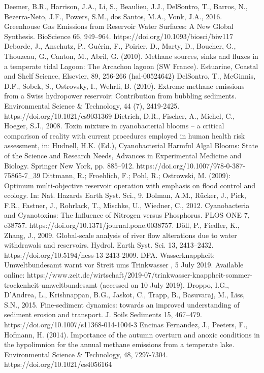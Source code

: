\begin{thebibliography}{}
Deemer, B.R., Harrison, J.A., Li, S., Beaulieu, J.J., DelSontro, T., Barros, N., Bezerra-Neto, J.F., Powers, S.M., dos Santos, M.A., Vonk, J.A., 2016. Greenhouse Gas Emissions from Reservoir Water Surfaces: A New Global Synthesis. BioScience 66, 949–964. https://doi.org/10.1093/biosci/biw117
Deborde, J., Anschutz, P., Guérin, F., Poirier, D., Marty, D., Boucher, G., Thouzeau, G., Canton, M., Abril, G. (2010). Methane sources, sinks and fluxes in a temperate tidal Lagoon: The Arcachon lagoon (SW France). Estuarine, Coastal and Shelf Science, Elsevier, 89, 256-266 (hal-00524642)
DelSontro, T., McGinnis, D.F., Sobek, S., Ostrovsky, I., Wehrli, B. (2010). Extreme methane emissions from a Swiss hydropower reservoir: Contribution from bubbling sediments. Environmental Science & Technology, 44 (7), 2419-2425. https://doi.org/10.1021/es9031369
Dietrich, D.R., Fischer, A., Michel, C., Hoeger, S.J., 2008. Toxin mixture in cyanobacterial blooms – a critical comparison of reality with current procedures employed in human health risk assessment, in: Hudnell, H.K. (Ed.), Cyanobacterial Harmful Algal Blooms: State of the Science and Research Needs, Advances in Experimental Medicine and Biology. Springer New York, pp. 885–912. https://doi.org/10.1007/978-0-387-75865-7_39
Dittmann, R.; Froehlich, F.; Pohl, R.; Ostrowski, M. (2009): Optimum multi-objective reservoir operation with emphasis on flood control and ecology. In: Nat. Hazards Earth Syst. Sci., 9.
Dolman, A.M., Rücker, J., Pick, F.R., Fastner, J., Rohrlack, T., Mischke, U., Wiedner, C., 2012. Cyanobacteria and Cyanotoxins: The Influence of Nitrogen versus Phosphorus. PLOS ONE 7, e38757. https://doi.org/10.1371/journal.pone.0038757.
Döll, P., Fiedler, K., Zhang, J., 2009. Global-scale analysis of river flow alterations due to water withdrawals and reservoirs. Hydrol. Earth Syst. Sci. 13, 2413–2432. https://doi.org/10.5194/hess-13-2413-2009.
DPA. Wasserknappheit: Umweltbundesamt warnt vor Streit ums Trinkwasser , 5 July 2019. Available online: https://www.zeit.de/wirtschaft/2019-07/trinkwasser-knappheit-sommer-trockenheit-umweltbundesamt (accessed on 10 July 2019).
Droppo, I.G., D’Andrea, L., Krishnappan, B.G., Jaskot, C., Trapp, B., Basuvaraj, M., Liss, S.N., 2015. Fine-sediment dynamics: towards an improved understanding of sediment erosion and transport. J. Soils Sediments 15, 467–479. https://doi.org/10.1007/s11368-014-1004-3
Encinas Fernandez, J., Peeters, F., Hofmann, H. (2014). Importance of the autumn overturn and anoxic conditions in the hypolimnion for the annual methane emissions from a temperate lake. Environmental Science & Technology, 48, 7297-7304. https://doi.org/10.1021/es4056164

\end{thebibliography}
